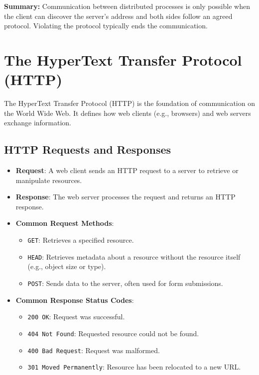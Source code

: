 \documentclass[../../compsys.tex]{subfiles}
\begin{document}
\noindent
\textbf{Summary:} Communication between distributed processes is only possible when the client can discover the server's address and both sides follow an agreed protocol. Violating the protocol typically ends the communication.
\section{The HyperText Transfer Protocol (HTTP)}
The HyperText Transfer Protocol (HTTP) is the foundation of communication on the World Wide Web. It defines how web clients (e.g., browsers) and web servers exchange information.

\subsection{HTTP Requests and Responses}
\begin{itemize}[label=$\bullet$]
    \item \textbf{Request}: A web client sends an HTTP request to a server to retrieve or manipulate resources.
    \item \textbf{Response}: The web server processes the request and returns an HTTP response.
    \item \textbf{Common Request Methods}:
        \begin{itemize}[label=--]
            \item \texttt{GET}: Retrieves a specified resource.
            \item \texttt{HEAD}: Retrieves metadata about a resource without the resource itself (e.g., object size or type).
            \item \texttt{POST}: Sends data to the server, often used for form submissions.
        \end{itemize}
    \item \textbf{Common Response Status Codes}:
        \begin{itemize}[label=--]
            \item \texttt{200 OK}: Request was successful.
            \item \texttt{404 Not Found}: Requested resource could not be found.
            \item \texttt{400 Bad Request}: Request was malformed.
            \item \texttt{301 Moved Permanently}: Resource has been relocated to a new URL.
        \end{itemize}
\end{itemize}
\end{document}

